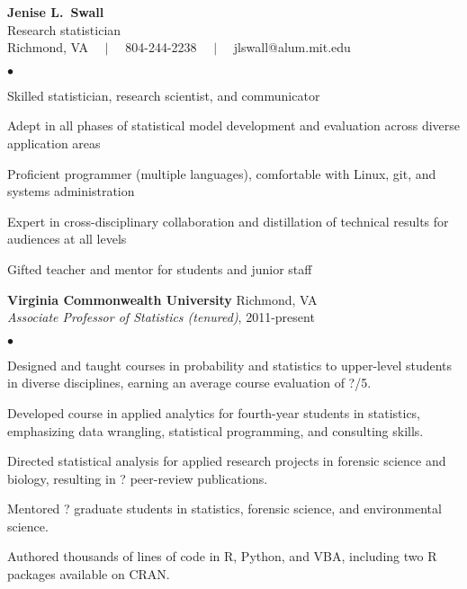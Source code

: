 \documentclass[11pt]{article}
\def\newsectn{\vspace*{0.6cm}}
\def\newempl{\vspace*{0.4cm}}
\begin{document}
\thispagestyle{empty}


\begin{center}
{\Large{\textbf{Jenise L.~Swall}}}\\
{\Large{Research statistician}}\\ \vspace*{0.05in}
Richmond, VA $\quad | \quad$ 804-244-2238 $\quad | \quad$ jlswall@alum.mit.edu\\
\hrulefill
\end{center}




\begin{list}{$\bullet$}{
  \setlength{\topsep}{0cm}
  \setlength{\partopsep}{0cm}
  \setlength{\parsep}{0cm}
  \setlength{\itemsep}{0cm}
  \setlength{\labelsep}{1ex}
  \setlength{\labelwidth}{1em}
  \setlength{\leftmargin}{1em}
  }
\item Skilled statistician, research scientist, and communicator
\item Adept in all phases of statistical model development and evaluation across
diverse application areas
\item Proficient programmer (multiple languages), comfortable with Linux,
git, and systems administration
\item Expert in cross-disciplinary collaboration and distillation of technical
results for audiences at all levels
\item Gifted teacher and mentor for students and junior staff
\end{list}


\newsectn
{} 


\textbf{Virginia Commonwealth University}  \hfill Richmond, VA\\
\textit{Associate Professor of Statistics (tenured)}, 2011-present

\begin{list}{$\bullet$}{
\setlength{\topsep}{0cm}
\setlength{\partopsep}{0cm}
\setlength{\parsep}{0cm}
\setlength{\itemsep}{0cm}
\setlength{\labelsep}{1ex}
\setlength{\labelwidth}{1em}
\setlength{\leftmargin}{1em}
}
\item Designed and taught courses in probability and statistics to upper-level
students in diverse disciplines, earning an average course evaluation of
?\slash 5.
\item Developed course in applied analytics for fourth-year students in
statistics, emphasizing data wrangling, statistical programming, and consulting
skills.
\item Directed statistical analysis for applied research projects in forensic
science and biology, resulting in ? peer-review publications.
\item Mentored ? graduate students in statistics, forensic science, and
environmental science.
\item Authored thousands of lines of code in R, Python, and VBA, including two R
packages available on CRAN.
\end{list}
\end{document}
